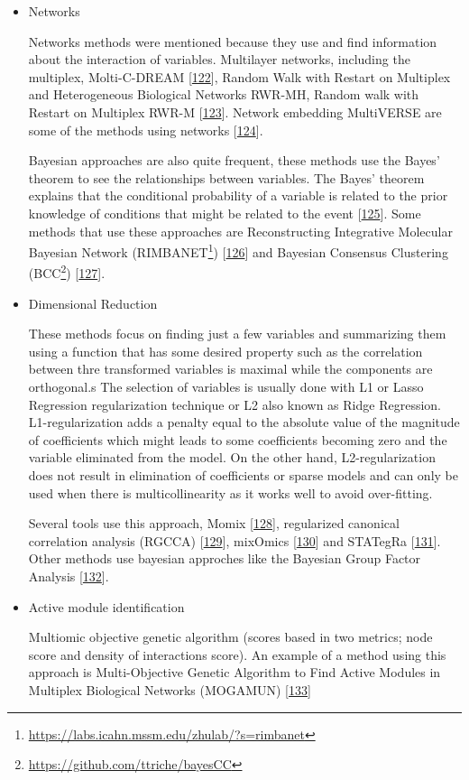 \documentclass[
  a4paper,
]{book}
\DeclareRobustCommand{\href}[2]{#2\footnote{\url{#1}}}
\begin{document}
\begin{itemize}
\item
  Networks

  Networks methods were mentioned because they use and find information about the interaction of variables.
  Multilayer networks, including the multiplex, Molti-C-DREAM {[}\protect\hyperlink{ref-didier2018}{122}{]}, Random Walk with Restart on Multiplex and Heterogeneous Biological Networks RWR-MH, Random walk with Restart on Multiplex RWR-M {[}\protect\hyperlink{ref-valdeolivas2019}{123}{]}.
  Network embedding MultiVERSE are some of the methods using networks {[}\protect\hyperlink{ref-pio-lopez2021}{124}{]}.

  Bayesian approaches are also quite frequent, these methods use the Bayes' theorem to see the relationships between variables.
  The Bayes' theorem explains that the conditional probability of a variable is related to the prior knowledge of conditions that might be related to the event {[}\protect\hyperlink{ref-bayes1763}{125}{]}.
  Some methods that use these approaches are Reconstructing Integrative Molecular Bayesian Network (\href{https://labs.icahn.mssm.edu/zhulab/?s=rimbanet}{RIMBANET}) {[}\protect\hyperlink{ref-zhu2012}{126}{]} and Bayesian Consensus Clustering (\href{https://github.com/ttriche/bayesCC}{BCC}) {[}\protect\hyperlink{ref-lock2013}{127}{]}.
\item
  Dimensional Reduction

  These methods focus on finding just a few variables and summarizing them using a function that has some desired property such as the correlation between thre transformed variables is maximal while the components are orthogonal.s The selection of variables is usually done with L1 or Lasso Regression regularization technique or L2 also known as Ridge Regression.
  L1-regularization adds a penalty equal to the absolute value of the magnitude of coefficients which might leads to some coefficients becoming zero and the variable eliminated from the model.
  On the other hand, L2-regularization does not result in elimination of coefficients or sparse models and can only be used when there is multicollinearity as it works well to avoid over-fitting.

  Several tools use this approach, Momix {[}\protect\hyperlink{ref-cantini_benchmarking_2020}{128}{]}, regularized canonical correlation analysis (RGCCA) {[}\protect\hyperlink{ref-tenenhaus2017}{129}{]}, mixOmics {[}\protect\hyperlink{ref-rohart2017}{130}{]} and STATegRa {[}\protect\hyperlink{ref-gomez-cabrero2019}{131}{]}.
  Other methods use bayesian approches like the Bayesian Group Factor Analysis {[}\protect\hyperlink{ref-virtanen2012}{132}{]}.
\item
  Active module identification

  Multiomic objective genetic algorithm (scores based in two metrics; node score and density of interactions score).
  An example of a method using this approach is Multi-Objective Genetic Algorithm to Find Active Modules in Multiplex Biological Networks (MOGAMUN) {[}\protect\hyperlink{ref-novoa-del-toro2020}{133}{]}
\end{itemize}
\end{document}

